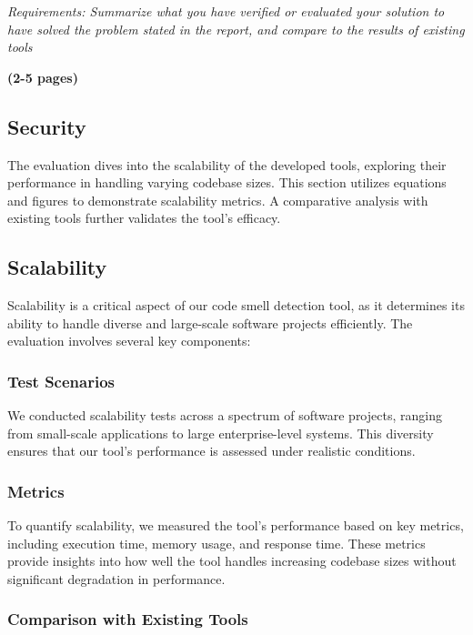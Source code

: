 \documentclass[journal]{IEEEtran}
\begin{document}
\textit{Requirements: Summarize what you have verified or evaluated your solution to have solved the problem stated in the report, and compare to the results of existing tools}

\textbf{(2-5 pages)}


\subsection{Security}
The evaluation dives into the scalability of the developed tools, exploring their performance in handling varying codebase sizes. This section utilizes equations and figures to demonstrate scalability metrics. A comparative analysis with existing tools further validates the tool's efficacy.


\subsection{Scalability}
\label{evaluate:Scalability}

Scalability is a critical aspect of our code smell detection tool, as it determines its ability to handle diverse and large-scale software projects efficiently. The evaluation involves several key components:

\subsubsection{Test Scenarios}

We conducted scalability tests across a spectrum of software projects, ranging from small-scale applications to large enterprise-level systems. This diversity ensures that our tool's performance is assessed under realistic conditions.

\subsubsection{Metrics}

To quantify scalability, we measured the tool's performance based on key metrics, including execution time, memory usage, and response time. These metrics provide insights into how well the tool handles increasing codebase sizes without significant degradation in performance.

\subsubsection{Comparison with Existing Tools}
\end{document}
